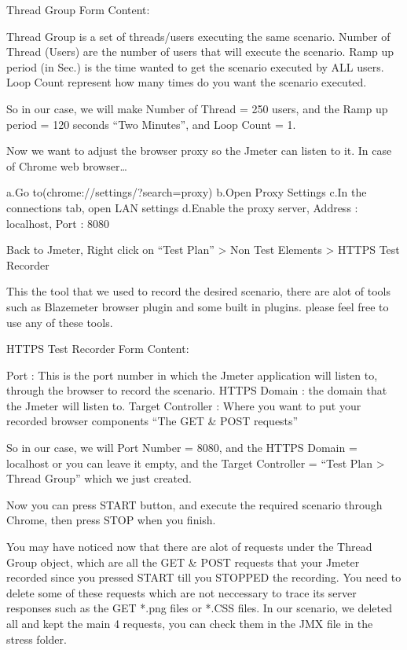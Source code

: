 \documentclass[letterpaper,10pt,english]{sphinxmanual}
\begin{document}
Thread Group Form Content:

Thread Group is a set of threads/users executing the same scenario.
Number of Thread (Users) are the number of users that will execute the scenario.
Ramp up period (in Sec.) is the time wanted to get the scenario executed by ALL users.
Loop Count represent how many times do you want the scenario executed.

So in our case, we will make Number of Thread = 250 users, and the Ramp up period = 120 seconds “Two Minutes”, and Loop Count = 1.


Now we want to adjust the browser proxy so the Jmeter can listen to it. In case of Chrome web browser…

a.Go to(chrome://settings/?search=proxy)
b.Open Proxy Settings
c.In the connections tab, open LAN settings
d.Enable the proxy server, Address : localhost, Port : 8080


Back to Jmeter, Right click on “Test Plan” \textendash{}\textgreater{} Non Test Elements \textendash{}\textgreater{} HTTPS Test Recorder

This the tool that we used to record the desired scenario, there are alot of tools such as Blazemeter browser plugin and some built in plugins. please feel free to use any of these tools.

HTTPS Test Recorder Form Content:

Port : This is the port number in which the Jmeter application will listen to, through the browser to record the scenario.
HTTPS Domain : the domain that the Jmeter will listen to.
Target Controller : Where you want to put your recorded browser components “The GET \& POST requests”

So in our case, we will Port Number = 8080, and the HTTPS Domain = localhost or you can leave it empty, and the Target Controller = “Test Plan \textendash{}\textgreater{} Thread Group” which we just created.

Now you can press START button, and execute the required scenario through Chrome, then press STOP when you finish.


You may have noticed now that there are alot of requests under the Thread Group object, which are all the GET \& POST requests that your Jmeter recorded since you pressed START till you STOPPED the recording.
You need to delete some of these requests which are not neccessary to trace its server responses such as the GET *.png files or *.CSS files. In our scenario, we deleted all and kept the main 4 requests, you can check them in the JMX file in the stress folder.
\end{document}
